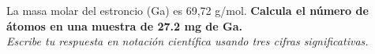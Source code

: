 La masa molar del estroncio (Ga) es 69,72 g/mol.
\textbf{Calcula el número de átomos en una muestra de 27.2 mg de Ga.}\\
\emph{Escribe tu respuesta en notación científica usando tres cifras significativas.}
